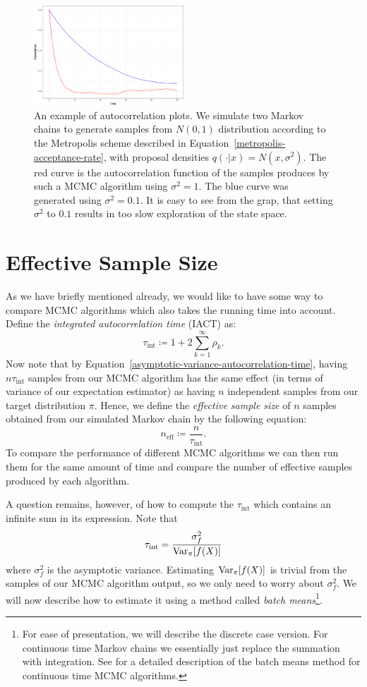 \documentclass[report.tex]{subfiles}
\begin{document}
\begin{figure}
  \centering
  \includegraphics[width=0.5\textwidth]{img/appendix-autocorrelations-example}
  \caption{An example of autocorrelation plots. We simulate two Markov chains to generate
    samples from $N(0, 1)$ distribution according to the Metropolis scheme described in
    Equation~\ref{metropolis-acceptance-rate}, with proposal densities $q(\cdot \vert x) = N(x, \sigma^{2}).$
    The red curve is the autocorrelation function of the samples produces by such a MCMC
    algorithm using $\sigma^{2} = 1$.
    The blue curve was generated using $\sigma^{2} = 0.1$.
    It is easy to see from the grap, that
    setting $\sigma^{2}$ to $0.1$ results in too slow exploration of the state space.}
  \label{image-autocorrelation-function-example}
\end{figure}


\section{Effective Sample Size}
As we have briefly mentioned already, we would like to have some way to compare MCMC algorithms
which also takes the running time into account. Define the \textit{integrated autocorrelation time}
(IACT) as:
$$
\tau_{\text{int}} \coloneqq 1 + 2 \sum_{k = 1}^{\infty} \rho_{k}.
$$
Now note that by Equation~\ref{asymptotic-variance-autocorrelation-time},
having $n \tau_{\text{int}}$ samples from our MCMC algorithm has the same effect
(in terms of variance of our expectation estimator) as having $n$ independent samples
from our target distribution $\pi$.
Hence, we define the \textit{effective sample size} of $n$ samples obtained from our simulated
Markov chain by the following equation:
$$
n_{\text{eff}} \coloneqq \frac{n}{\tau_{\text{int}}}.
$$
To compare the performance of different MCMC algorithms we can then run them
for the same amount of time and compare the number of effective samples produced
by each algorithm.

A question remains, however, of how to compute the $\tau_{\text{int}}$ which contains
an infinite sum in its expression.
Note that
$$
\tau_{\text{int}} = \frac{\sigma_{f}^{2}}{\mathrm{Var}_{{\pi}}\!\left[{f(X)}\right]}
$$
where $\sigma_{f}^{2}$ is the asymptotic variance. Estimating
$\mathrm{Var}_{{\pi}}\!\left[{f(X)}\right]$ is trivial from the samples of our MCMC
algorithm output, so we only need to worry about $\sigma_{f}^{2}$. We will now
describe how to estimate it using a method called \textit{batch means}\footnote{
 For ease of presentation, we will describe the discrete case version.
 For continuous time Markov chains we essentially just
 replace the summation with integration. See \citet{bierkens2016zig} for a detailed
 description of the batch means method for continuous time MCMC algorithms.
}.
\end{document}
